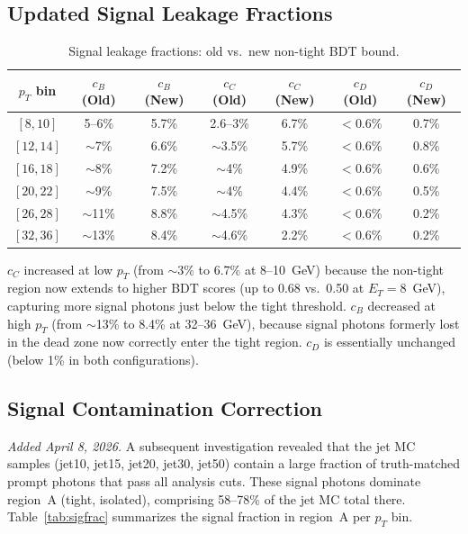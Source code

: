 \documentclass[11pt,a4paper]{article}
\begin{document}
\subsection{Updated Signal Leakage Fractions}

\begin{table}[H]
\centering
\caption{Signal leakage fractions: old vs.\ new non-tight BDT bound.}
\label{tab:leakage_comparison}
\begin{tabular}{@{}ccccccc@{}}
\toprule
$p_T$ bin & $c_B$ (Old) & $c_B$ (New) & $c_C$ (Old) & $c_C$ (New) & $c_D$ (Old) & $c_D$ (New) \\
\midrule
$[8,10]$   & 5--6\%  & 5.7\% & 2.6--3\% & 6.7\% & $<$0.6\% & 0.7\% \\
$[12,14]$  & $\sim$7\%  & 6.6\% & $\sim$3.5\% & 5.7\% & $<$0.6\% & 0.8\% \\
$[16,18]$  & $\sim$8\%  & 7.2\% & $\sim$4\%   & 4.9\% & $<$0.6\% & 0.6\% \\
$[20,22]$  & $\sim$9\%  & 7.5\% & $\sim$4\%   & 4.4\% & $<$0.6\% & 0.5\% \\
$[26,28]$  & $\sim$11\% & 8.8\% & $\sim$4.5\% & 4.3\% & $<$0.6\% & 0.2\% \\
$[32,36]$  & $\sim$13\% & 8.4\% & $\sim$4.6\% & 2.2\% & $<$0.6\% & 0.2\% \\
\bottomrule
\end{tabular}
\end{table}

$c_C$ increased at low $p_T$ (from $\sim$3\% to 6.7\% at 8--10~GeV) because the
non-tight region now extends to higher BDT scores (up to 0.68 vs.\ 0.50 at
$E_T = 8$~GeV), capturing more signal photons just below the tight threshold.
$c_B$ decreased at high $p_T$ (from $\sim$13\% to 8.4\% at 32--36~GeV),
because signal photons formerly lost in the dead zone now correctly enter the
tight region. $c_D$ is essentially unchanged (below 1\% in both configurations).

\subsection{Signal Contamination Correction}
\label{sec:signal_contamination}

\textit{Added April 8, 2026.} A subsequent investigation revealed that the
jet MC samples (jet10, jet15, jet20, jet30, jet50) contain a large fraction
of truth-matched prompt photons that pass all analysis cuts. These signal
photons dominate region~A (tight, isolated), comprising 58--78\% of the
jet MC total there. Table~\ref{tab:sigfrac} summarizes the signal fraction
in region~A per $p_T$ bin.
\end{document}
